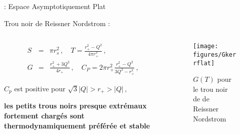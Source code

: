 \begin{frame}{\underline{\secname} : Espace Asymptotiquement Plat}
\begin{block}{Trou noir de Reissner Nordstrom :}
	
	\begin{columns}
		\begin{column}{0.5\linewidth}
				\begin{eqnarray*}
		S&=& \pi r_s^2\,,\quad
		T = \frac{r_+^2-Q^2}{4\pi r_+^3}\,,\nonumber\\
		G&=&\frac{r_+^2+3Q^2}{4r_+}\,,\quad C_P=2\pi r_+^2\frac{r_+^2-Q^2}{3Q^2-r_+^2}\,,
			\end{eqnarray*}	
			
$C_p$ est positive  pour $\sqrt{3}|Q|> r_+>|Q|\,,$
	\pause		

\begin{center}
	\textbf{les petits trous noirs presque extrémaux fortement chargés sont thermodynamiquement préférée et stable}
\end{center}			
			
		\end{column}
		\begin{column}{0.5\linewidth}
			\begin{figure}[H]
				\begin{center}
					\texttt{[image: figures/Gkerrflat]}
					
					\caption{$G(T)$ pour le trou noir de de Reissner Nordstrom}
				\end{center}
			\end{figure}
			
			
		\end{column}
	\end{columns}
\end{block}
\end{frame}




